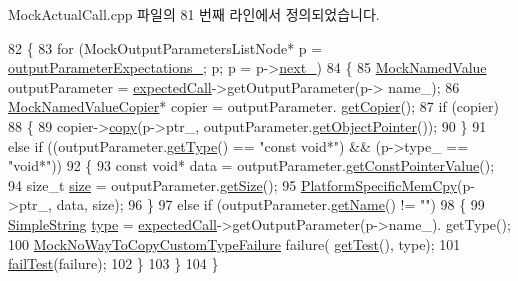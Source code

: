 Mock\+Actual\+Call.\+cpp 파일의 81 번째 라인에서 정의되었습니다.


\begin{DoxyCode}
82 \{
83     \textcolor{keywordflow}{for} (MockOutputParametersListNode* p = \hyperlink{class_mock_checked_actual_call_a02acb8bd949c46aac38abc754e4dfc36}{outputParameterExpectations\_}; p; p =
       p->\hyperlink{class_mock_checked_actual_call_1_1_mock_output_parameters_list_node_a48980b6753fe91ed89c1959b171615d6}{next\_})
84     \{
85         \hyperlink{class_mock_named_value}{MockNamedValue} outputParameter = \hyperlink{_mock_support__c_8cpp_a4640ae963cf020e35f7ebd1481685c8b}{expectedCall}->getOutputParameter(p->
      name\_);
86         \hyperlink{class_mock_named_value_copier}{MockNamedValueCopier}* copier = outputParameter.
      \hyperlink{class_mock_named_value_a40fe9225b38a6cf65b71ae55c5e581a8}{getCopier}();
87         \textcolor{keywordflow}{if} (copier)
88         \{
89             copier->\hyperlink{class_mock_named_value_copier_aa02ce3bdc5575d21faa2c0ea37e1b160}{copy}(p->ptr\_, outputParameter.\hyperlink{class_mock_named_value_a4d4696a9a24da96598cfbe4865c23c66}{getObjectPointer}());
90         \}
91         \textcolor{keywordflow}{else} \textcolor{keywordflow}{if} ((outputParameter.\hyperlink{class_mock_named_value_a149f9255153928a6fff62d1ff94d9dcf}{getType}() == \textcolor{stringliteral}{"const void*"}) && (p->type\_ == \textcolor{stringliteral}{"void*"}))
92         \{
93             \textcolor{keyword}{const} \textcolor{keywordtype}{void}* data = outputParameter.\hyperlink{class_mock_named_value_a3e3eb7694ed79472dadc96359067e832}{getConstPointerValue}();
94             \textcolor{keywordtype}{size\_t} \hyperlink{gst__avb__playbin_8c_a439227feff9d7f55384e8780cfc2eb82}{size} = outputParameter.\hyperlink{class_mock_named_value_af55b3790622878d65ed5ff2bb2b3fcc4}{getSize}();
95             \hyperlink{_platform_specific_functions__c_8h_afa460cb2fb7a1dd8a4c2138f84c9ed93}{PlatformSpecificMemCpy}(p->ptr\_, data, size);
96         \}
97         \textcolor{keywordflow}{else} \textcolor{keywordflow}{if} (outputParameter.\hyperlink{class_mock_named_value_ab9fb89f09ab681191e4eaa9221b42491}{getName}() != \textcolor{stringliteral}{""})
98         \{
99             \hyperlink{class_simple_string}{SimpleString} \hyperlink{namespaceastime__fitline_a7aead736a07eaf25623ad7bfa1f0ee2d}{type} = \hyperlink{_mock_support__c_8cpp_a4640ae963cf020e35f7ebd1481685c8b}{expectedCall}->getOutputParameter(p->name\_).
      getType();
100             \hyperlink{class_mock_no_way_to_copy_custom_type_failure}{MockNoWayToCopyCustomTypeFailure} failure(
      \hyperlink{class_mock_checked_actual_call_aa10112b41f7ed20162b12633042bb775}{getTest}(), type);
101             \hyperlink{class_mock_checked_actual_call_a275e824525aa26cb8874437442cdc186}{failTest}(failure);
102         \}
103     \}
104 \}
\end{DoxyCode}


